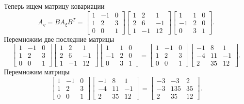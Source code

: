 \begin{enumerate}[label=\alph*)]
  Теперь ищем матрицу ковариации
  $$A_{ \eta } =
    BA_{ \xi } B^T =
    \begin{bmatrix}
      1 & -1 & 0 \\
      1 & 2 & 3 \\
      0 & 0 & 1
    \end{bmatrix}
    \begin{bmatrix}
      1 & 2 & 1 \\
      2 & 6 & -1 \\
      1 & -1 & 12
    \end{bmatrix}
    \begin{bmatrix}
      1 & 1 & 0 \\
      -1 & 2 & 0 \\
      0 & 3 & 1
    \end{bmatrix}.$$
  Перемножим две последние матрицы
  $$ \begin{bmatrix}
      1 & -1 & 0 \\
      1 & 2 & 3 \\
      0 & 0 & 1
    \end{bmatrix}
    \begin{bmatrix}
      1 & 2 & 1 \\
      2 & 6 & -1 \\
      1 & -1 & 12
    \end{bmatrix}
    \begin{bmatrix}
      1 & 1 & 0 \\
      -1 & 2 & 0 \\
      0 & 3 & 1
    \end{bmatrix} =
    \begin{bmatrix}
      1 & -1 & 0 \\
      1 & 2 & 3 \\
      0 & 0 & 1
    \end{bmatrix}
    \begin{bmatrix}
      -1 & 8 & 1 \\
      -4 & 11 & -1 \\
      2 & 35 & 12
    \end{bmatrix}.$$
  Перемножим матрицы
  $$ \begin{bmatrix}
      1 & -1 & 0 \\
      1 & 2 & 3 \\
      0 & 0 & 1
    \end{bmatrix}
    \begin{bmatrix}
      -1 & 8 & 1 \\
      -4 & 11 & -1 \\
      2 & 35 & 12
    \end{bmatrix} =
    \begin{bmatrix}
      -3 & -3 & 2 \\
      -3 & 135 & 35 \\
      2 & 35 & 12
    \end{bmatrix}.$$


\end{enumerate}
